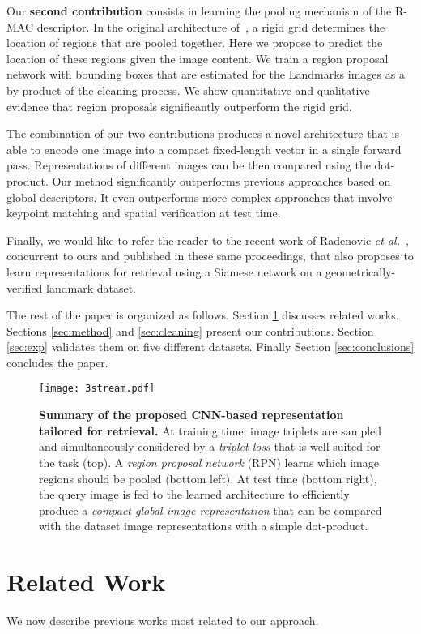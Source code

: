 \documentclass[runningheads]{llncs}
\def\etal{\emph{et al.}~}
\begin{document}
Our \textbf{second contribution} consists in learning the pooling mechanism of the R-MAC descriptor.
In the original architecture of~\cite{Tolias2016}, a rigid grid determines the location of regions that are pooled together.
Here we propose to predict the location of these regions given the image content. 
We train a region proposal network with bounding boxes that are estimated for the Landmarks images as a by-product of the cleaning process.
We show quantitative and qualitative evidence that region proposals significantly outperform the rigid grid.

The combination of our two contributions produces a novel architecture that is able to encode one image into a compact fixed-length vector in a single forward pass. Representations of different images can be then compared using the dot-product.
Our method significantly outperforms previous approaches based on global descriptors. It even outperforms more complex approaches that involve keypoint matching and spatial verification at test time.

Finally, we would like to refer the reader to the recent work of Radenovic \etal\cite{Radenovic2016}, concurrent to ours and published in these same proceedings, that also proposes to learn representations for retrieval using a Siamese network on a geometrically-verified landmark dataset.

The rest of the paper is organized as follows. Section \ref{sec:rw} discusses related works. Sections \ref{sec:method} and \ref{sec:cleaning}
present our contributions. Section \ref{sec:exp} validates them on five different datasets. Finally
Section \ref{sec:conclusions} concludes the paper. 

\begin{figure}[t!]
\texttt{[image: 3stream.pdf]}
\caption{\textbf{Summary of the proposed CNN-based representation tailored for retrieval.} At training time, image triplets are
sampled and simultaneously considered by a \textit{triplet-loss} that is well-suited for the task (top). A \textit{region proposal network} (RPN) learns which image
regions should be pooled (bottom left). At test time (bottom right), the query image is fed to the learned architecture to
efficiently produce a \textit{compact global image representation} that can be compared with the dataset image representations with a
simple dot-product.  \label{fig:method}}
\end{figure}

\section{Related Work}
\label{sec:rw}
We now describe previous works most related to our approach.
\end{document}
